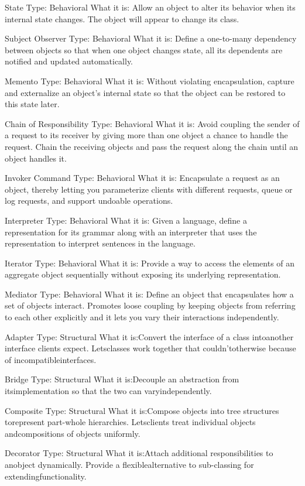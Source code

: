 State
Type: Behavioral
What it is: Allow an object to alter its behavior when its internal state changes. The object will appear to change its class.

Subject Observer
Type: Behavioral
What it is: Define a one-to-many dependency between objects so that when one object changes state, all its dependents are notified and updated automatically.

Memento
Type: Behavioral
What it is: Without violating encapsulation, capture and externalize an object's internal state so that the object can be restored to this state later.

Chain of Responsibility
Type: Behavioral
What it is: Avoid coupling the sender of a request to its receiver by giving more than one object a chance to handle the request. Chain the receiving objects and pass the request along the chain until an object handles it.

Invoker Command
Type: Behavioral
What it is: Encapsulate a request as an object, thereby letting you parameterize clients with different requests, queue or log requests, and support undoable operations.

Interpreter
Type: Behavioral
What it is: Given a language, define a representation for its grammar along with an interpreter that uses the representation to interpret sentences in the language.

Iterator
Type: Behavioral
What it is: Provide a way to access the elements of an aggregate object sequentially without exposing its underlying representation.

Mediator
Type: Behavioral
What it is: Define an object that encapsulates how a set of objects interact. Promotes loose coupling by keeping objects from referring to each other explicitly and it lets you vary their interactions independently.


Adapter
Type: Structural
What it is:Convert the interface of a class intoanother interface clients expect. Letsclasses work together that couldn'totherwise because of incompatibleinterfaces.

Bridge
Type: Structural
What it is:Decouple an abstraction from itsimplementation so that the two can varyindependently.

Composite
Type: Structural
What it is:Compose objects into tree structures torepresent part-whole hierarchies. Letsclients treat individual objects andcompositions of objects uniformly.

Decorator
Type: Structural
What it is:Attach additional responsibilities to anobject dynamically. Provide a flexiblealternative to sub-classing for extendingfunctionality.

